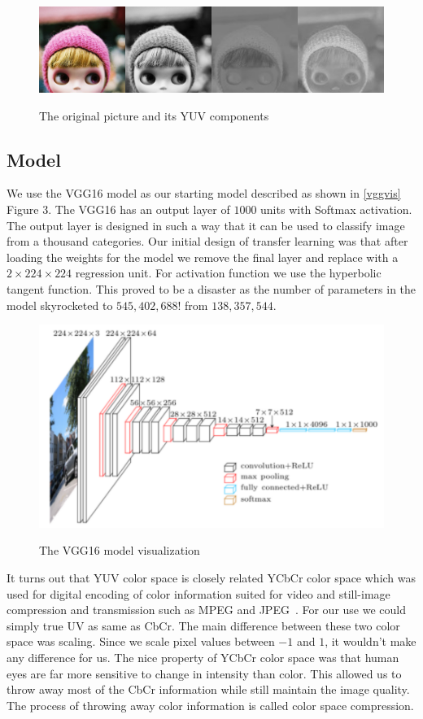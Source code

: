 \documentclass[12pt]{article}
\begin{document}
\begin{figure}[!ht]
 \centering
  \includegraphics[width=5.0in]{resource/YUV.png}
 \label{yuvimage}
 \caption{The original picture and its YUV components}
\end{figure}


\subsection{Model}
We use the VGG16 model as our starting model described as shown in \ref{vggvis} Figure 3. The VGG16 has an output layer of $1000$ units with Softmax activation. The output layer is designed in such a way that it can be used to classify image from a thousand categories. Our initial design of transfer learning was that after loading the weights for the model we remove the final layer and replace with a $2\times224\times224$ regression unit. For activation function we use the hyperbolic tangent function. This proved to be a disaster as the number of parameters in the model skyrocketed to $545,402,688$! from  $138,357,544$. 


\begin{figure}[H]
 \centering
  \includegraphics[width=5.0in]{resource/vgg16.png}
\center
\label{fig:vggvis}
 \caption{The VGG16 model visualization}
\end{figure}

It turns out that YUV color space is closely related YCbCr color space which was used for digital encoding of color information suited for video and still-image compression and transmission such as MPEG and JPEG~\cite{YUVWIKI}. For our use we could simply true UV as same as CbCr. The main difference between these two color space was scaling. Since we scale pixel values between $-1$ and $1$, it wouldn't make any difference for us. The nice property of YCbCr color space was that human eyes are far more sensitive to change in intensity than color. This allowed us to throw away most of the CbCr information while still maintain the image quality. The process of throwing away color information is called color space compression. 
\end{document}
